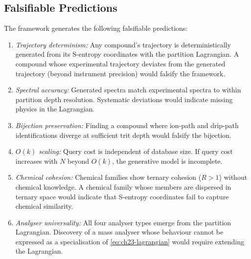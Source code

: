 \subsection{Falsifiable Predictions}
\label{sec:ch23-predictions}

The framework generates the following falsifiable predictions:
\begin{enumerate}
  \item \emph{Trajectory determinism:} Any compound's trajectory is
    deterministically generated from its S-entropy coordinates with the
    partition Lagrangian.  A compound whose experimental trajectory deviates
    from the generated trajectory (beyond instrument precision) would falsify
    the framework.
  \item \emph{Spectral accuracy:} Generated spectra match experimental
    spectra to within partition depth resolution.  Systematic deviations
    would indicate missing physics in the Lagrangian.
  \item \emph{Bijection preservation:} Finding a compound where ion-path
    and drip-path identifications diverge at sufficient trit depth would
    falsify the bijection.
  \item \emph{$O(k)$ scaling:} Query cost is independent of database size.
    If query cost increases with $N$ beyond $O(k)$, the generative model
    is incomplete.
  \item \emph{Chemical cohesion:} Chemical families show ternary cohesion
    ($R > 1$) without chemical knowledge.  A chemical family whose members are
    dispersed in ternary space would indicate that S-entropy coordinates fail to
    capture chemical similarity.
  \item \emph{Analyser universality:} All four analyser types emerge from the
    partition Lagrangian.  Discovery of a mass analyser whose behaviour cannot
    be expressed as a specialisation of \eqref{eq:ch23-lagrangian} would
    require extending the Lagrangian.
\end{enumerate}

